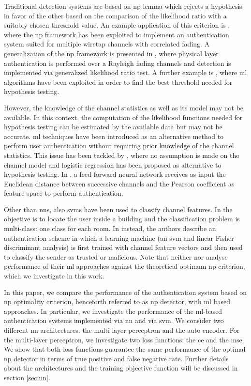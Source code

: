 \documentclass[draftcls,onecolumn,12pt]{IEEEtran}
\begin{document}
Traditional detection systems are based on \ac{np} lemma which rejects a hypothesis in favor of the other based on the comparison of the likelihood ratio with a suitably chosen threshold value. An example application of this criterion is \cite{Baracca-12}, where the \ac{np} framework has been exploited to implement an authentication system suited for multiple wiretap channels with correlated fading. A generalization of the \ac{np} framework is presented in \cite{Xiao-09}, where physical layer authentication is performed over a Rayleigh fading channels and detection is implemented via generalized likelihood ratio test. A further example is \cite{Pan-17}, where \ac{ml} algorithms have been exploited in order to find the best threshold needed for hypothesis testing.

However, the knowledge of the channel statistics as well as its model may not be available. In this context, the computation of the likelihood functions needed for hypothesis testing can be estimated by the available data but may not be accurate. \ac{ml} techniques have been introduced as an alternative method to perform user authentication without requiring prior knowledge of the channel statistics. This issue has been tackled by \cite{xiao-2018}, where no assumption is made on the channel model and logistic regression has been proposed as alternative to hypothesis testing. In \cite{Wang-17}, a feed-forward neural network receives as input the Euclidean distance between successive channels and the Pearson coefficient as feature space to perform authentication. 

Other than \acp{nn}, also \acp{svm} have been used to classify channel features. In \cite{tian2015robust} the objective is to locate the user inside a building and the classification problem is multi-class: one class for each room. In \cite{pei2014channel} instead, the authors describe an authentication scheme in which a learning machine (an \ac{svm} and linear Fisher discriminant analysis) is first trained with channel feature vectors and then used to classify the sender as trusted or malicious. Note that neither \cite{pei2014channel} nor \cite{tian2015robust} analyse performance of their \ac{ml} approaches against the theoretical optimum \ac{np} criterion, which we investigate in this work.

In this paper, we compare the performance of the authentication system based on \ac{np} optimality criterion, henceforth referred to as \ac{np} detector, with \ac{ml} based approaches. In particular, we investigate the performance of the \ac{ml}-based authentication systems implemented via \ac{nn} and via \ac{svm}. We consider two different \ac{nn} architectures: the multi-layer perceptron and the auto-encoder. For the multi-layer perceptron, we investigate two loss functions: the \ac{ce} and the \ac{mse}. We show that both loss functions guarantee the same performance of the optimal \ac{np} detector in terms of true positive and false negative rate. Further details about the architectures and the training objective function will be discussed in section \ref{sec:nn}.
\end{document}
